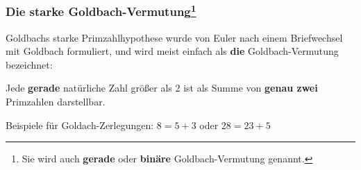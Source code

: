\begin{refsegment}
\hypertarget{HT-StrongGoldbachConjecture}{}
\subsubsection[Die starke Goldbach-Vermutung]%
   {Die starke Goldbach-Vermutung\footnote{%
   Sie wird auch \textbf{gerade} oder \textbf{binäre} Goldbach-Vermutung
   genannt.
   } }%
%
\label{L-StrongGoldbachConjecture}%

\noindent Goldbachs starke Primzahlhypothese wurde von Euler nach einem Briefwechsel mit Goldbach formuliert, und wird meist einfach als \textbf{die} Goldbach-Vermutung bezeichnet:

Jede \textbf{gerade} natürliche Zahl größer als 2 ist als Summe von \textbf{genau zwei} Primzahlen darstellbar.

Beispiele für Goldach-Zerlegungen: $8 = 5 + 3$ oder $28 = 23 + 5$


\end{refsegment}
